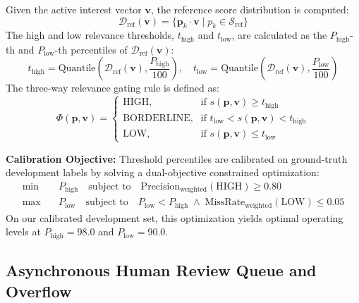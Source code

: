 Given the active interest vector $\mathbf{v}$, the reference score distribution is computed:
\begin{equation}
\mathcal{D}_{\text{ref}}(\mathbf{v}) = \{ \mathbf{p}_k \cdot \mathbf{v} \mid p_k \in \mathcal{S}_{\text{ref}} \}
\end{equation}
The high and low relevance thresholds, $t_{\text{high}}$ and $t_{\text{low}}$, are calculated as the $P_{\text{high}}$-th and $P_{\text{low}}$-th percentiles of $\mathcal{D}_{\text{ref}}(\mathbf{v})$:
\begin{equation}
t_{\text{high}} = \text{Quantile}\left(\mathcal{D}_{\text{ref}}(\mathbf{v}), \frac{P_{\text{high}}}{100}\right), \quad t_{\text{low}} = \text{Quantile}\left(\mathcal{D}_{\text{ref}}(\mathbf{v}), \frac{P_{\text{low}}}{100}\right)
\end{equation}
The three-way relevance gating rule is defined as:
\begin{equation}
\Phi(\mathbf{p}, \mathbf{v}) = \begin{cases}
\text{HIGH}, & \text{if } s(\mathbf{p}, \mathbf{v}) \ge t_{\text{high}} \\
\text{BORDERLINE}, & \text{if } t_{\text{low}} < s(\mathbf{p}, \mathbf{v}) < t_{\text{high}} \\
\text{LOW}, & \text{if } s(\mathbf{p}, \mathbf{v}) \le t_{\text{low}}
\end{cases}
\end{equation}

\noindent\textbf{Calibration Objective:} Threshold percentiles are calibrated on ground-truth development labels by solving a dual-objective constrained optimization:
\begin{align}
\min \quad & P_{\text{high}} \quad \text{subject to} \quad \text{Precision}_{\text{weighted}}(\text{HIGH}) \ge 0.80 \\
\max \quad & P_{\text{low}} \quad \text{subject to} \quad P_{\text{low}} < P_{\text{high}} \;\land\; \text{MissRate}_{\text{weighted}}(\text{LOW}) \le 0.05 \nonumber
\end{align}
On our calibrated development set, this optimization yields optimal operating levels at $P_{\text{high}} = 98.0$ and $P_{\text{low}} = 90.0$.

\subsection{Asynchronous Human Review Queue and Overflow}
\label{sec:review_queue}

